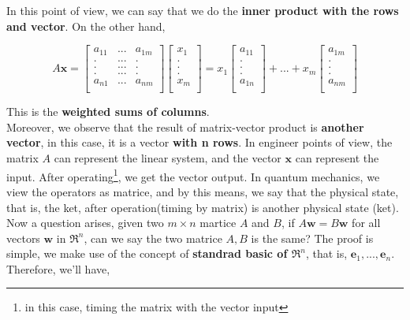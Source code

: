 \documentclass[12pt]{article}
\begin{document}
In this point of view, we can say that we do the \textbf{inner product with the rows and vector}. On the other hand, 

\begin{center}
    \[ A\mathbf{x} = \begin{bmatrix}
        a_{11} & ... & a_{1m}\\
        . & ... & .\\
        . & ... & .\\
        . & ... & .\\
        a_{n1} & ... & a_{nm}\\
    \end{bmatrix} \begin{bmatrix}
        x_1\\
        .\\
        .\\
        .\\
        x_m\\
    \end{bmatrix} = x_{1}\begin{bmatrix}
        a_{11}\\
        .\\.\\.\\
        a_{1n}\\
    \end{bmatrix} + ... + x_{m}\begin{bmatrix}
        a_{1m}\\
        .\\.\\.\\
        a_{nm}\\
    \end{bmatrix} \]
\end{center}

This is the \textbf{weighted sums of columns}.
\\
\indent Moreover, we observe that the result of matrix-vector product is \textbf{another vector}, in this case, it is a vector \textbf{with n rows}. In engineer points of view, the matrix $A$ can represent the linear system, and the vector $\mathbf{x}$ can represent the input. After operating\footnote{in this case, timing the matrix with the vector input}, we get the vector output. In quantum mechanics, we view the operators as matrice, and by this means, we say that the physical state, that is, the ket, after operation(timing by matrix) is another physical state (ket).
\\
\indent Now a question arises, given two $m \times n$ martice $A$ and $B$, if $A\mathbf{w} = B \mathbf{w}$ for all vectors $\mathbf{w}$ in $\mathfrak{R}^n$, can we say the two matrice $A, B$ is the same?
The proof is simple, we make use of the concept of \textbf{standrad basic of $\mathfrak{R}^n$}, that is, ${\mathbf{e}_1, ..., \mathbf{e}_n}$. Therefore, we'll have,
\end{document}
